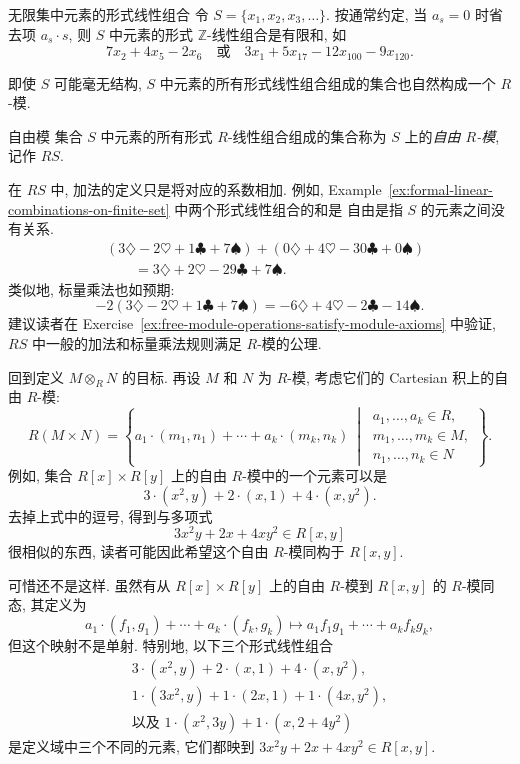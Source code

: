 \begin{Example}{无限集中元素的形式线性组合}\leavevmode\label{ex:formal-linear-combinations-on-infinite-set}
令 $S=\{x_{1},x_{2},x_{3},\ldots\}$. 按通常约定, 当 $a_{s}=0$ 时省去项 $a_{s}\cdot s$, 则 $S$ 中元素的形式 $\mathbb{Z}$-线性组合是有限和, 如
\[
  7x_{2}+4x_{5}-2x_{6}
  \quad\text{或}\quad
  3x_{1}+5x_{17}-12x_{100}-9x_{120}.
\]
\end{Example}

即使 $S$ 可能毫无结构, $S$ 中元素的所有形式线性组合组成的集合也自然构成一个 $R$-模.

\begin{Definition}{自由模}\leavevmode\label{def:free-module-on-a-set}
集合 $S$ 中元素的所有形式 $R$-线性组合组成的集合称为 $S$ 上的\emph{自由 $R$-模}, 记作 $RS$.
\end{Definition}

\BookPairedNote
  {在 $RS$ 中, 加法的定义只是将对应的系数相加. 例如, Example~\ref{ex:formal-linear-combinations-on-finite-set} 中两个形式线性组合的和是}
  {\textquotedbl{}自由\textquotedbl{}是指 $S$ 的元素之间没有关系.}
\[
  \begin{aligned}
    &(3\diamondsuit-2\heartsuit+1\clubsuit+7\spadesuit)
      +(0\diamondsuit+4\heartsuit-30\clubsuit+0\spadesuit)\\
    &\qquad=3\diamondsuit+2\heartsuit-29\clubsuit+7\spadesuit.
  \end{aligned}
\]
类似地, 标量乘法也如预期:
\[
  -2(3\diamondsuit-2\heartsuit+1\clubsuit+7\spadesuit)
    =-6\diamondsuit+4\heartsuit-2\clubsuit-14\spadesuit.
\]
建议读者在 Exercise~\ref{ex:free-module-operations-satisfy-module-axioms} 中验证, $RS$ 中一般的加法和标量乘法规则满足 $R$-模的公理.

回到定义 $M\otimes_{R}N$ 的目标. 再设 $M$ 和 $N$ 为 $R$-模, 考虑它们的 Cartesian 积上的自由 $R$-模:
\[
  R(M\times N)=\left\{
    a_{1}\cdot(m_{1},n_{1})+\cdots+a_{k}\cdot(m_{k},n_{k})
    \ \middle|\ 
    \begin{array}{l}
      a_{1},\ldots,a_{k}\in R,\\
      m_{1},\ldots,m_{k}\in M,\\
      n_{1},\ldots,n_{k}\in N
    \end{array}
  \right\}.
\]
例如, 集合 $R[x]\times R[y]$ 上的自由 $R$-模中的一个元素可以是
\[
  3\cdot(x^{2},y)+2\cdot(x,1)+4\cdot(x,y^{2}).
\]
去掉上式中的逗号, 得到与多项式
\[
  3x^{2}y+2x+4xy^{2}\in R[x,y]
\]
很相似的东西, 读者可能因此希望这个自由 $R$-模同构于 $R[x,y]$.

可惜还不是这样. 虽然有从 $R[x]\times R[y]$ 上的自由 $R$-模到 $R[x,y]$ 的 $R$-模同态, 其定义为
\[
  a_{1}\cdot(f_{1},g_{1})+\cdots+a_{k}\cdot(f_{k},g_{k})
  \longmapsto a_{1}f_{1}g_{1}+\cdots+a_{k}f_{k}g_{k},
\]
但这个映射不是单射. 特别地, 以下三个形式线性组合
\[
  \begin{gathered}
    3\cdot(x^{2},y)+2\cdot(x,1)+4\cdot(x,y^{2}),\\
    1\cdot(3x^{2},y)+1\cdot(2x,1)+1\cdot(4x,y^{2}),\\
    \text{以及 }1\cdot(x^{2},3y)+1\cdot(x,2+4y^{2})
  \end{gathered}
\]
是定义域中三个不同的元素, 它们都映到 $3x^{2}y+2x+4xy^{2}\in R[x,y]$.

